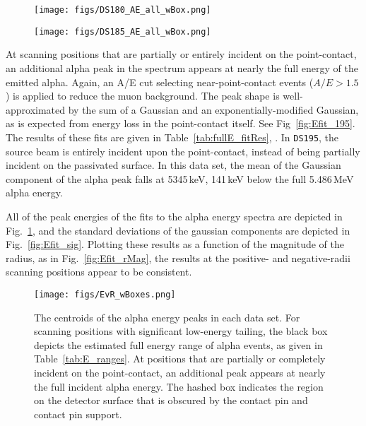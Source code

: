 \documentclass[groupedaddress,rmp,amsmath,amssymb,bibnotes,altaffilletter,twocolumn]{revtex4-1}
\begin{document}
\begin{figure*}[]
 \centering
 \begin{subfigure}[]{.45\textwidth}
 \texttt{[image: figs/DS180\_AE\_all\_wBox.png]}
\end{subfigure}
 \begin{subfigure}[]{.45\textwidth}
 \texttt{[image: figs/DS185\_AE\_all\_wBox.png]}
\end{subfigure}
 \caption{At small radii, ({\it left:} $r=-3.0$\,mm, {\it right:} $r=-2.25$\,mm) the alpha peak becomes highly non-Gaussian and becomes impossible to fit with a Gaussian+low energy tail model. Depending on the scanning position, the energy ranges of the high-A/E alpha events (indicated by the boxed regions above and listed in Table~\ref{tab:E_ranges}) are given to supplement or stand in place of the fit result information.} 
 \label{fig:AEvE}
\end{figure*}

At scanning positions that are partially or entirely incident on the point-contact, an additional alpha peak in the spectrum appears at nearly the full energy of the emitted alpha. Again, an A/E cut selecting near-point-contact events ($A/E>1.5$) is applied to reduce the muon background. The peak shape is well-approximated by the sum of a Gaussian and an exponentially-modified Gaussian, as is expected from energy loss in the point-contact itself. See Fig~\ref{fig:Efit_195}. The results of these fits are given in Table~\ref{tab:fullE_fitRes}, . In {\tt DS195}, the source beam is entirely incident upon the point-contact, instead of being partially incident on the passivated surface. In this data set, the mean of the Gaussian component of the alpha peak falls at 5345\,keV, 141\,keV below the full 5.486\,MeV alpha energy. 

All of the peak energies of the fits to the alpha energy spectra are depicted in Fig.~\ref{fig:Efit_mu}, and the standard deviations of the gaussian components are depicted in Fig.~\ref{fig:Efit_sig}. Plotting these results as a function of the magnitude of the radius, as in Fig.~\ref{fig:Efit_rMag}, the results at the positive- and negative-radii scanning positions appear to be consistent. 

\begin{figure}[]
 \centering
 \texttt{[image: figs/EvR\_wBoxes.png]}
 \caption{The centroids of the alpha energy peaks in each data set. For scanning positions with significant low-energy tailing, the black box depicts the estimated full energy range of alpha events, as given in Table~\ref{tab:E_ranges}. At positions that are partially or completely incident on the point-contact, an additional peak appears at nearly the full incident alpha energy. The hashed box indicates the region on the detector surface that is obscured by the contact pin and contact pin support.} 
 \label{fig:Efit_mu}
\end{figure}
\end{document}

